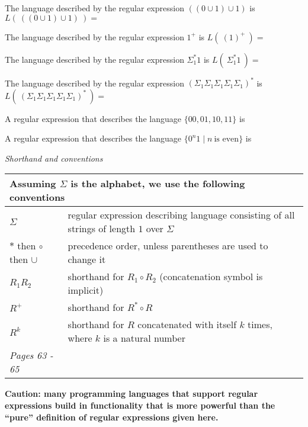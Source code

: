 \documentclass[12pt, oneside]{article}
\begin{document}
The language described by the regular expression $((0 \cup 1) \cup 1)$ is $L(~((0 \cup 1) \cup 1)~) = $

\vfill

The language described by the regular expression $1^+$ is $L(~(1)^+~) = $

\vfill

The language described by the regular expression $\Sigma_1^* 1$ is $L(~\Sigma_1^* 1~) = $

\vfill

The language described by the regular expression $(\Sigma_1 \Sigma_1 \Sigma_1 \Sigma_1 \Sigma_1)^*$ 
is $L(~(\Sigma_1 \Sigma_1 \Sigma_1 \Sigma_1 \Sigma_1)^*~) = $

\vfill

A regular expression that describes the language $\{00, 01, 10, 11\}$ is 

\vfill

A regular expression that describes the language $\{ 0^n1 \mid n~\text{is even} \}$ is

\vfill

{\it Shorthand and conventions}
    
\begin{center}
    \begin{tabular}{|ll|}
    \hline
    \multicolumn{2}{|l|}{Assuming $\Sigma$ is the alphabet, we use the following conventions}\\
    \hline
    $\Sigma$   & regular  expression describing language consisting of  all strings  of length  $1$ over $\Sigma$\\
    $*$ then $\circ$ then $\cup$   & precedence order, unless parentheses are used to change it\\
    $R_1R_2$ & shorthand  for  $R_1  \circ R_2$ (concatenation symbol is implicit) \\
    $R^+$ & shorthand for $R^* \circ R$ \\
    $R^k$ & shorthand for $R$ concatenated with itself $k$ times, where $k$ is a natural number\\
    \hline
    {\it Pages 63 - 65 }& \\
    \hline
    \end{tabular}
\end{center}

\newpage
{\bf Caution: many programming languages that support regular expressions build in functionality
that is more powerful than the ``pure'' definition of regular expressions given here. }
\end{document}
